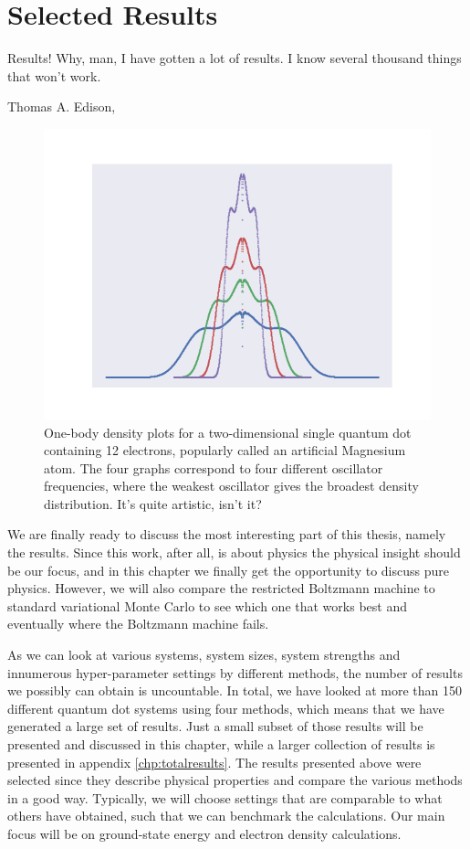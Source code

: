 \chapter{Selected Results} \label{chp:results}
\epigraph{Results! Why, man, I have gotten a lot of results. I know several thousand things that won't work.}{Thomas A. Edison, \cite{noauthor_edisonian_nodate}}
\begin{figure}[H]
	\centering
	\includegraphics[scale=0.6]{Images/art.png}
	\caption{One-body density plots for a two-dimensional single quantum dot containing 12 electrons, popularly called an artificial Magnesium atom. The four graphs correspond to four different oscillator frequencies, where the weakest oscillator gives the broadest density distribution. It's quite artistic, isn't it?}
\end{figure}

We are finally ready to discuss the most interesting part of this thesis, namely the results. Since this work, after all, is about physics the physical insight should be our focus, and in this chapter we finally get the opportunity to discuss pure physics. However, we will also compare the restricted Boltzmann machine to standard variational Monte Carlo to see which one that works best and eventually where the Boltzmann machine fails.

As we can look at various systems, system sizes, system strengths and innumerous hyper-parameter settings by different methods, the number of results we possibly can obtain is uncountable. In total, we have looked at more than 150 different quantum dot systems using four methods, which means that we have generated a large set of results. Just a small subset of those results will be presented and discussed in this chapter, while a larger collection of results is presented in appendix \ref{chp:totalresults}. The results presented above were selected since they describe physical properties and compare the various methods in a good way. Typically, we will choose settings that are comparable to what others have obtained, such that we can benchmark the calculations. Our main focus will be on ground-state energy and electron density calculations. 


